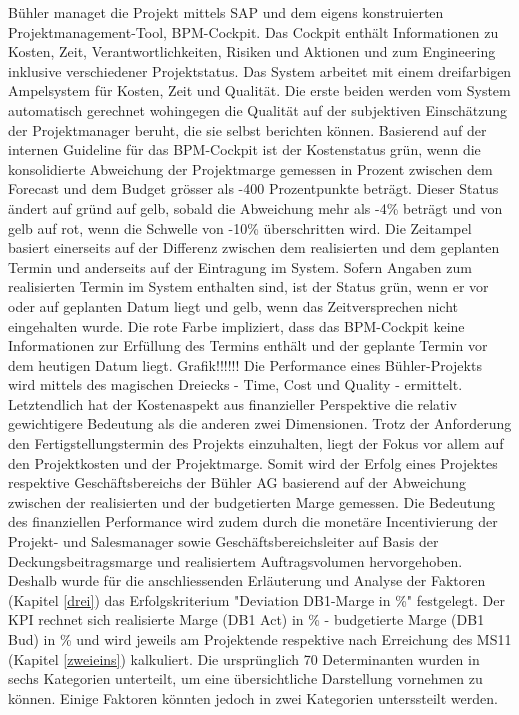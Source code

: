 Bühler managet die Projekt mittels SAP und dem eigens konstruierten Projektmanagement-Tool, BPM-Cockpit. Das Cockpit enthält Informationen zu Kosten, Zeit, Verantwortlichkeiten, Risiken und Aktionen und zum Engineering inklusive verschiedener Projektstatus. Das System arbeitet mit einem dreifarbigen Ampelsystem für Kosten, Zeit und Qualität. Die erste beiden werden vom System automatisch gerechnet wohingegen die Qualität auf der subjektiven Einschätzung der Projektmanager beruht, die sie selbst berichten können. Basierend auf der internen Guideline für das BPM-Cockpit ist der Kostenstatus grün, wenn die konsolidierte Abweichung der Projektmarge gemessen in Prozent zwischen dem Forecast und dem Budget grösser als -400 Prozentpunkte beträgt. Dieser Status ändert auf gründ auf gelb, sobald die Abweichung mehr als -4\% beträgt und von gelb auf rot, wenn die Schwelle von -10\% überschritten wird. Die Zeitampel basiert einerseits auf der Differenz zwischen dem realisierten und dem geplanten Termin und anderseits auf der Eintragung im System. Sofern Angaben zum realisierten Termin im System enthalten sind, ist der Status grün, wenn er vor oder auf geplanten Datum liegt und gelb, wenn das Zeitversprechen nicht eingehalten wurde. Die rote Farbe impliziert, dass das BPM-Cockpit keine Informationen zur Erfüllung des Termins enthält und der geplante Termin vor dem heutigen Datum liegt.
\newline
Grafik!!!!!!
\newline
Die Performance eines Bühler-Projekts wird mittels des magischen Dreiecks - Time, Cost und Quality -  ermittelt. Letztendlich hat der Kostenaspekt aus finanzieller Perspektive die relativ gewichtigere Bedeutung als die anderen zwei Dimensionen. Trotz der Anforderung den Fertigstellungstermin des Projekts einzuhalten, liegt der Fokus vor allem auf den Projektkosten und der Projektmarge. Somit wird der Erfolg eines Projektes respektive Geschäftsbereichs der Bühler AG basierend auf der Abweichung zwischen der realisierten und der budgetierten Marge gemessen. Die Bedeutung des finanziellen Performance wird zudem durch die monetäre Incentivierung der Projekt- und Salesmanager sowie Geschäftsbereichsleiter auf Basis der Deckungsbeitragsmarge und realisiertem Auftragsvolumen hervorgehoben. Deshalb wurde für die anschliessenden Erläuterung und Analyse der Faktoren (Kapitel \ref{drei}) das Erfolgskriterium "Deviation DB1-Marge in \%" festgelegt. Der KPI rechnet sich realisierte Marge (DB1 Act) in \% - budgetierte Marge (DB1 Bud) in \% und wird jeweils am Projektende respektive nach Erreichung des MS11 (Kapitel \ref{zweieins}) kalkuliert. Die ursprünglich 70 Determinanten wurden in sechs Kategorien unterteilt, um eine übersichtliche Darstellung vornehmen zu können. Einige Faktoren könnten jedoch in zwei Kategorien unterssteilt werden. 
